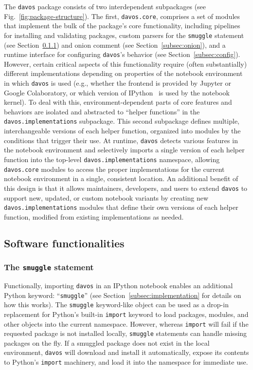 \documentclass[preprint,12pt,a4paper]{elsarticle}
\begin{document}
The \texttt{davos} package consists of two interdependent subpackages
(see Fig.~\ref{fig:package-structure}). The first,
\texttt{davos.core}, comprises a set of modules that
implement the bulk of the package's core
functionality, including pipelines for installing and validating
packages, custom parsers for the \texttt{smuggle} statement (see
Section~\ref{subsec:smuggle}) and onion comment (see
Section~\ref{subsec:onion}), and a runtime interface for configuring
\texttt{davos}'s behavior (see Section~\ref{subsec:config}). However,
certain critical aspects of this
functionality require (often substantially) different implementations
depending on properties of the notebook environment in which
\texttt{davos} is used (e.g., whether the frontend is provided by
Jupyter or Google Colaboratory, or which version of
IPython~\cite{PereGran07} is used by the notebook kernel). To deal
with this, environment-dependent parts of core features and behaviors
are isolated and abstracted to ``helper functions'' in the
\texttt{davos.implementations} subpackage. This second subpackage
defines multiple, interchangeable versions of each helper function,
organized into modules by the conditions that trigger their use. At
runtime, \texttt{davos} detects various features in the notebook
environment and selectively imports a single version of each helper
function into the top-level \texttt{davos.implementations} namespace,
allowing \texttt{davos.core} modules to access the proper
implementations for the current notebook environment in a single,
consistent location. An additional benefit of this design is that it
allows maintainers, developers, and users to extend \texttt{davos} to
support new, updated, or custom notebook variants by creating new
\texttt{davos.implementations} modules that define their own versions
of each helper function, modified from existing implementations as
needed.

\subsection{Software functionalities}

\subsubsection{The \texttt{smuggle} statement}\label{subsec:smuggle}

Functionally, importing \texttt{davos} in an IPython notebook enables
an additional Python keyword: ``\texttt{smuggle}'' (see
Section~\ref{subsec:implementation} for details on how this works).
The \texttt{smuggle} keyword-like object can be used as a drop-in
replacement for Python's built-in \texttt{import} keyword to load
packages, modules, and other objects into the current namespace.
However, whereas \texttt{import} will fail if the requested package is
not installed locally, \texttt{smuggle} statements can handle missing
packages on the fly.  If a smuggled package does not exist in the
local environment, \texttt{davos} will download and install it automatically,
expose its contents to Python's \texttt{import} machinery, and load it
into the namespace for immediate use.
\end{document}
